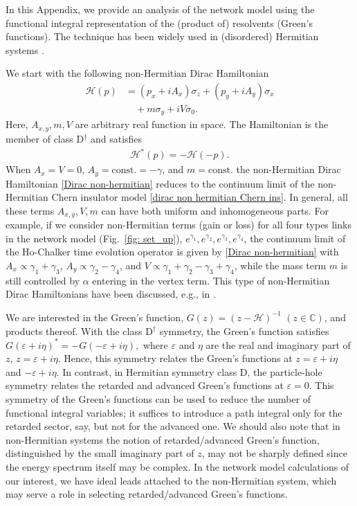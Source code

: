 \documentclass[aps,pra,reprint,superscriptaddress,showkeys,amsmath,amssymb,longbibliography]{revtex4-1}
\begin{document}
In this Appendix, we provide an analysis of the network model using the functional integral representation of the (product of) resolvents (Green's functions).
The technique has been widely used in (disordered) Hermitian systems \cite{Efetov:1997fw}.

We start with the following non-Hermitian Dirac Hamiltonian 
\begin{align}
  \label{Dirac non-hermitian}
  \mathcal{H}(p)
  &
  = (p_x+i A_x) \sigma_z + (p_y + i A_y)\sigma_x
  \nonumber \\
  &\quad
  + m \sigma_y + i V \sigma_0.
\end{align}
Here, $A_{x,y}, m, V$ are arbitrary real function in space.
The Hamiltonian is the member of class D$^{\dag}$ and satisfies
\begin{align}
\mathcal{H}^*(p)= - \mathcal{H}(-p). 
\end{align}
When $A_x=V=0$, $A_y = \mathrm{const.}=-\gamma$, and $m = \mathrm{const}.$ the non-Hermitian Dirac Hamiltonian \eqref{Dirac non-hermitian} reduces to the continuum limit of the non-Hermitian Chern insulator model \eqref{dirac non hermitian Chern ins}.
In general, all these terms $A_{x,y}, V, m$ can have both uniform and inhomogeneous parts.
For example, if we consider non-Hermitian terms (gain or loss) for all four types links in the network model (Fig.\ \ref{fig: set_up}), $e^{\gamma_1}, e^{\gamma_2}, e^{\gamma_3}, e^{\gamma_4}$, the continuum limit of the Ho-Chalker time evolution operator is given by \eqref{Dirac non-hermitian} with $A_x \propto \gamma_1+\gamma_3$, $A_y \propto \gamma_2-\gamma_4$, and $V \propto \gamma_1+\gamma_2 -\gamma_3+\gamma_4$, while the mass term $m$ is still controlled by $\alpha$ entering in the vertex term.
This type of non-Hermitian Dirac Hamiltonians have been discussed, e.g., in 
\cite{2000PhRvL..84.1292L, 2002JPhA...35.2555B, Yao2018a, Shen2018a}.

We are interested in the Green's function, $G(z)= (z - \mathcal{H})^{-1}$ $(z\in \mathbb{C})$, and products thereof. 
With the class D$^{\dag}$ symmetry, the Green's function satisfies $G(\varepsilon+i\eta)^* = - G(-\varepsilon+ i\eta),$ where $\varepsilon$ and $\eta$ are the real and imaginary part of $z$, $z= \varepsilon+ i\eta$.
Hence, this symmetry relates the Green's functions at $z=\varepsilon+i \eta$ and $-\varepsilon+i\eta$.
In contrast, in Hermitian symmetry class D, the particle-hole symmetry relates the retarded and advanced Green's functions at $\varepsilon=0$.
This symmetry of the Green's functions can be used to reduce the number of functional integral variables;
it suffices to introduce a path integral only for the retarded sector, say, but not for the advanced one.
We should also note that in non-Hermitian systems the notion of retarded/advanced Green's function, distinguished by the small imaginary part of $z$, may not be sharply defined since the energy spectrum itself may be complex.
In the network model calculations of our interest, we have ideal leads attached to the non-Hermitian system, which may serve a role in selecting retarded/advanced Green's functions.
\end{document}
